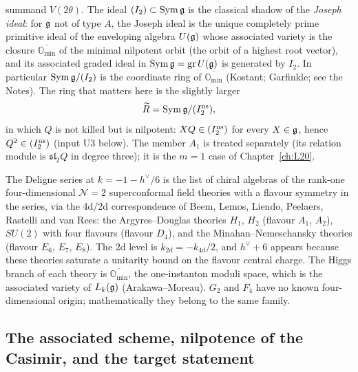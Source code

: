 summand $V(2\theta)$. The ideal $(I_2)\subset\operatorname{Sym}\mathfrak g$ is the classical shadow of the
\emph{Joseph ideal}: for $\mathfrak g$ not of type $A$, the Joseph ideal is the unique completely prime primitive ideal of
the enveloping algebra $U(\mathfrak g)$ whose associated variety is the closure $\overline{\mathbb O_{\min}}$ of the
minimal nilpotent orbit (the orbit of a highest root vector), and its associated graded ideal in
$\operatorname{Sym}\mathfrak g=\operatorname{gr}U(\mathfrak g)$ is generated by $I_2$. In particular
$\operatorname{Sym}\mathfrak g/(I_2)$ is the coordinate ring of $\overline{\mathbb O_{\min}}$ (Kostant; Garfinkle; see
the Notes). The ring that matters here is
the slightly larger
\begin{equation*}
\widetilde R=\operatorname{Sym}\mathfrak g/(I_2^{\mathrm{ns}}),
\end{equation*}
in which $Q$ is not killed but is nilpotent: $XQ\in(I_2^{\mathrm{ns}})$ for every $X\in\mathfrak g$, hence
$Q^2\in(I_2^{\mathrm{ns}})$ (input U3 below). The member $A_1$ is treated separately (its relation module
is $\mathfrak{sl}_2Q$ in degree three); it is the $m=1$ case of Chapter~\ref{ch:L20}.

\begin{physics}
The Deligne series at $k=-1-h^\vee/6$ is the list of chiral algebras of the rank-one four-dimensional
$\mathcal N=2$ superconformal field theories with a flavour symmetry in the series, via the 4d/2d
correspondence of Beem, Lemos, Liendo, Peelaers, Rastelli and van Rees: the Argyres--Douglas theories
$H_1$, $H_2$ (flavour $A_1$, $A_2$), $SU(2)$ with four flavours (flavour $D_4$), and the
Minahan--Nemeschansky theories (flavour $E_6$, $E_7$, $E_8$). The 2d level is $k_{2d}=-k_{4d}/2$, and
$h^\vee+6$ appears because these theories saturate a unitarity bound on the flavour central charge. The
Higgs branch of each theory is $\overline{\mathbb O_{\min}}$, the one-instanton moduli space, which is the
associated variety of $L_k(\mathfrak g)$ (Arakawa--Moreau). $G_2$ and $F_4$ have no known
four-dimensional origin; mathematically they belong to the same family.
\end{physics}

\subsection{The associated scheme, nilpotence of the Casimir, and the target statement}

